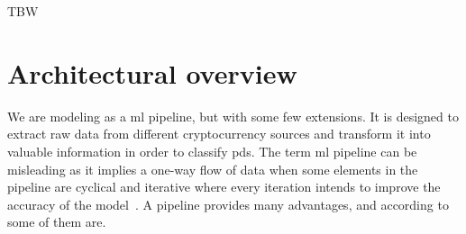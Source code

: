 




TBW
\section{Architectural overview}
We are modeling \project as a \ac{ml} pipeline, but with some few extensions. It is designed to extract raw data from different cryptocurrency sources and transform it into valuable information in order to classify \acp{pd}. The term \ac{ml} pipeline can be misleading as it implies a one-way flow of data when some elements in the pipeline are cyclical and iterative where every iteration intends to improve the accuracy of the model~\cite{ml_pipeline_3}. A pipeline provides many advantages, and according to \cite{ml_pipeline_2} some of them are.

